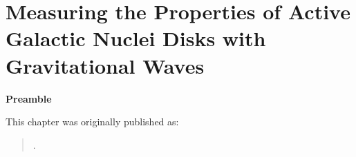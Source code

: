 \chapter[BBH in AGN spin Model]{Measuring the Properties of Active Galactic Nuclei Disks with Gravitational Waves}
\label{ch.agn}

\textbf{Preamble}

This chapter was originally published as:

\begin{quote}
.
\end{quote}


